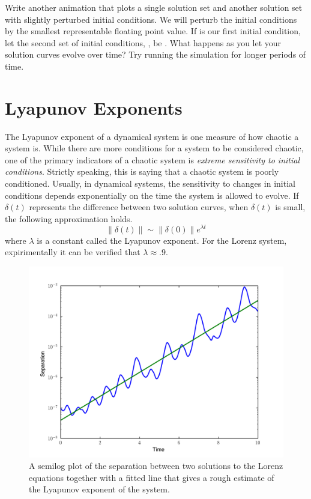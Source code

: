 \begin{problem}
Write another animation that plots a single solution set and another solution set with slightly perturbed initial conditions.
We will perturb the initial conditions by the smallest representable floating point value.
If  is our first initial condition, let the second set of initial conditions, , be .
What happens as you let your solution curves evolve over time?
Try running the simulation for longer periods of time.
\end{problem}

\section*{Lyapunov Exponents}
The Lyapunov exponent of a dynamical system is one measure of how chaotic a system is.
While there are more conditions for a system to be considered chaotic, one of the primary indicators of a chaotic system is \emph{extreme sensitivity to initial conditions}.
Strictly speaking, this is saying that a chaotic system is poorly conditioned.
Usually, in dynamical systems, the sensitivity to changes in initial conditions depends exponentially on the time the system is allowed to evolve.
If $\delta(t)$ represents the difference between two solution curves, when $\delta(t)$ is small, the following approximation holds.
\[\|\delta(t)\| \sim \|\delta(0)\| e^{\lambda t}\]
where $\lambda$ is a constant called the Lyapunov exponent.
For the Lorenz system, expirimentally it can be verified that $\lambda \approx .9$.

\begin{figure}
\includegraphics[width=\textwidth]{lyapunov_plot.pdf}
\caption{A semilog plot of the separation between two solutions to the Lorenz equations together with a fitted line that gives a rough estimate of the Lyapunov exponent of the system.}
\label{fig:lyapunov_exponent}
\end{figure}

